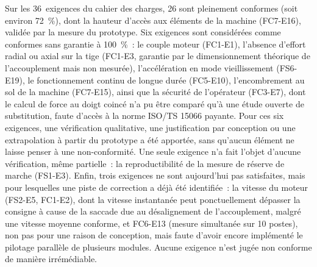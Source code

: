 Sur les 36~exigences du cahier des charges, 26 sont pleinement conformes (soit
environ 72~\%), dont la hauteur d'accès aux éléments de la machine (FC7-E16),
validée par la mesure du prototype. Six exigences sont considérées comme
conformes sans garantie à 100~\%~: le couple moteur (FC1-E1), l'absence
d'effort radial ou axial sur la tige (FC1-E3, garantie par le dimensionnement
théorique de l'accouplement mais non mesurée), l'accélération en mode
vieillissement (FS6-E19), le fonctionnement continu de longue durée
(FC5-E10), l'encombrement au sol de la machine (FC7-E15), ainsi que la
sécurité de l'opérateur (FC3-E7), dont le calcul de force au doigt coincé
n'a pu être comparé qu'à une étude ouverte de substitution, faute d'accès à
la norme ISO/TS 15066 payante. Pour ces six exigences, une vérification
qualitative, une justification par conception ou une extrapolation à partir
du prototype a été apportée, sans qu'aucun élément ne laisse penser à une
non-conformité. Une seule exigence n'a fait l'objet d'aucune vérification,
même partielle~: la reproductibilité de la mesure de réserve de marche
(FS1-E3). Enfin, trois exigences ne sont aujourd'hui pas satisfaites, mais
pour lesquelles une piste de correction a déjà été identifiée~: la vitesse
du moteur (FS2-E5, FC1-E2), dont la vitesse instantanée peut ponctuellement
dépasser la consigne à cause de la saccade due au désalignement de
l'accouplement, malgré une vitesse moyenne conforme, et FC6-E13 (mesure
simultanée sur 10 postes), non pas pour une raison de conception, mais
faute d'avoir encore implémenté le pilotage parallèle de plusieurs modules.
Aucune exigence n'est jugée non conforme de manière irrémédiable.
